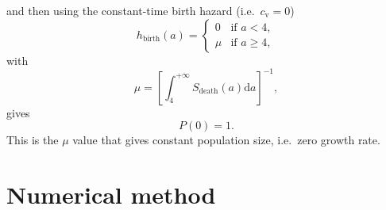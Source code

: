\documentclass[12pt]{article}
\newcommand{\md}{\mathrm{d}}
\begin{document}
and then using the constant-time birth hazard
(i.e.~$c_{\mathrm{v}} = 0$)
\begin{equation}
  h_{\text{birth}}(a) =
  \begin{cases}
    0 & \text{if $a < 4$}, \\
    \mu & \text{if $a \geq 4$},
  \end{cases}
\end{equation}
with
\begin{equation}
  \mu =
  \left[
    \int_4^{+\infty} S_{\text{death}}(a) \md a
  \right]^{-1},
\end{equation}
gives
\begin{equation}
  P(0) = 1.
\end{equation}
This is the $\mu$ value that gives constant population size,
i.e.~zero growth rate.


\section{Numerical method}
\end{document}
